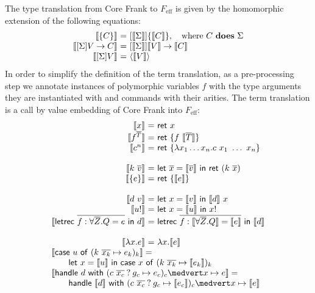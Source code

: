 \documentclass[preprint]{sigplanconf}
\makeatletter
\newcommand{\feff}{$F_\textrm{eff}$\xspace}
\newcommand{\many}{\overline}
\newcommand{\sem}[1]{\llbracket{#1}\rrbracket}
\newcommand\ba{\begin{array}}
\newcommand\ea{\end{array}}
\newenvironment{equations}{\[\ba{@{}r@{~}c@{~}l@{}}}{\ea\]}
\newcommand{\judgeword}[1]{~\mathbf{#1}~}
\newcommand{\rt}[1]{\langle{#1}\rangle}   %
\newcommand{\effs}[2]{{#1} \judgeword{does} {#2}}
\newcommand{\sigs}{\Sigma}
\newcommand{\effbox}[1]{[#1]}
\newcommand{\key}[1]{\mathsf{#1}}
\newcommand{\handleSymbol}{\mathbin{?}}
\newcommand{\handle}[2]{{#1} \handleSymbol {#2}}
\newcommand{\thunk}[1]{\{{#1}\}}
\newcommand{\force}[1]{{#1}!}
\makeatother
\begin{document}
The type translation from Core Frank to \feff is given by the
homomorphic extension of the following equations:
\begin{equations}
\sem{\thunk{C}} &=& \effbox{\sem{\sigs}}\thunk{\sem{C}}, \quad \text{where }\effs{C}{\sigs} \\
\sem{\effbox{\sigs}V \to C} &=& \effbox{\sem{\sigs}}\sem{V} \to \sem{C} \\
\sem{\effbox{\sigs}V} &=& \rt{\sem{V}}\\
\end{equations}%
%
%
In order to simplify the definition of the term translation, as a
pre-processing step we annotate instances of polymorphic variables $f$
with the type arguments they are instantiated with and commands with
their arities.
%
The term translation is a call by value embedding of Core Frank into
\feff:
%
\begin{equations}
\sem{x} &=& \key{ret}~x \\
\sem{f^{\many{T}}} &=& \key{ret}~\thunk{f~\sem{\many{T}}} \\
\sem{c^n} &=& \key{ret}~\thunk{\lambda x_1 \dots x_n.c~x_1~\dots~x_n} \\
\\
\sem{k~\many{v}} &=& \key{let}~\many{x}=\sem{\many{v}} ~\key{in}~\key{ret}~(k~\many{x}) \\
\sem{\thunk{e}} &=& \key{ret}~\thunk{\sem{e}} \\
\\
\sem{d~v} &=& \key{let}~x=\sem{v} ~\key{in}~\sem{d}~x \\
\sem{\force{u}} &=& \key{let}~x=\sem{u} ~\key{in}~\force{x} \\
\sem{\key{letrec}~\many{f : \forall \many{Z}.Q = e}~\key{in}~d} &=&
  \key{letrec}~\many{f : \sem{\forall \many{Z}.Q} = \sem{e}}~\key{in}~\sem{d} \\
\\
\sem{\lambda x.e} &=& \lambda x.\sem{e} \\
\multicolumn{3}{@{}l}{\sem{\key{case}~u~\key{of}~(k~\many{x_k} \mapsto e_k)_k} =} \\
\multicolumn{3}{@{}l}
  {\qquad \key{let}~x=\sem{u} ~\key{in}~
    \key{case}~x~\key{of}~(k~\many{x_k} \mapsto \sem{e_k})_k} \\
\multicolumn{3}{@{}l}{\sem{\key{handle}~d~\key{with}~(\handle{c~\many{x_c}}{g_c} \mapsto e_c)_c \medvert x \mapsto e} =} \\
\multicolumn{3}{@{}l}
  {\qquad \key{handle}~\sem{d}~\key{with}~ 
            (\handle{c~\many{x_c}}{g_c} \mapsto \sem{e_c})_c
            \medvert x \mapsto \sem{e}} \\
\end{equations}%
\end{document}
